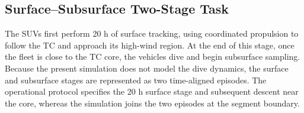 \documentclass[a4paper,fleqn]{cas-dc}
\begin{document}
\subsection{Surface--Subsurface Two-Stage Task}
\label{subsec:handoff}

The SUVs first perform 20 h of surface tracking, using coordinated propulsion
to follow the TC and approach its high-wind region. At the end of this stage,
once the fleet is close to the TC core, the vehicles dive and begin subsurface
sampling. Because the present simulation does not model the dive dynamics, the
surface and subsurface stages are represented as two time-aligned episodes. The
operational protocol specifies the 20 h surface stage and subsequent descent
near the core, whereas the simulation joins the two episodes at the segment
boundary.
\end{document}
